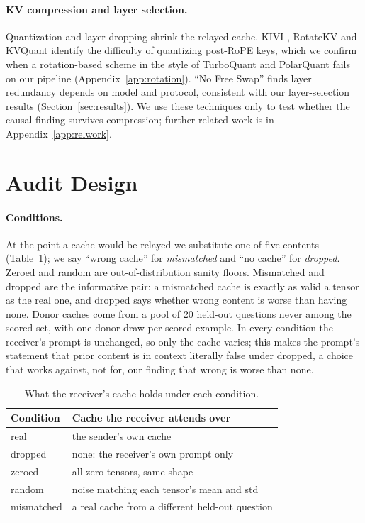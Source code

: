 \documentclass[11pt]{article}
\begin{document}
\paragraph{KV compression and layer selection.} Quantization and layer
dropping shrink the relayed cache. KIVI \citep{kivi2024}, RotateKV
\citep{rotatekv2025} and KVQuant \citep{kvquant2024} identify the
difficulty of quantizing post-RoPE keys, which we confirm when a
rotation-based scheme in the style of TurboQuant \citep{turboquant2026}
and PolarQuant \citep{polarquant2026} fails on our pipeline
(Appendix~\ref{app:rotation}). ``No Free Swap'' \citep{nofreeswap2026}
finds layer redundancy depends on model and protocol, consistent with
our layer-selection results (Section~\ref{sec:results}). We use these
techniques only to test whether the causal finding survives compression;
further related work is in Appendix~\ref{app:relwork}.

\section{Audit Design}
\label{sec:method}

\paragraph{Conditions.} At the point a cache would be relayed we
substitute one of five contents (Table~\ref{tab:conditions}); we say ``wrong
cache'' for \emph{mismatched} and ``no cache'' for \emph{dropped}. Zeroed and
random are out-of-distribution sanity floors. Mismatched and dropped are the
informative pair: a mismatched cache is exactly as valid a tensor as the real
one, and dropped says whether wrong content is worse than having none. Donor caches come from a pool of 20 held-out
questions never among the scored set, with one donor draw per scored
example. In every condition the receiver's prompt is unchanged, so only
the cache varies; this makes the prompt's statement that prior content is
in context literally false under dropped, a choice that works against,
not for, our finding that wrong is worse than none.

\begin{table}[t]
\centering
\small
\caption{What the receiver's cache holds under each condition.}
\label{tab:conditions}
\begin{tabular}{lp{5.2cm}}
\toprule
\textbf{Condition} & \textbf{Cache the receiver attends over} \\
\midrule
real       & the sender's own cache \\
dropped    & none: the receiver's own prompt only \\
zeroed     & all-zero tensors, same shape \\
random     & noise matching each tensor's mean and std \\
mismatched & a real cache from a different held-out question \\
\bottomrule
\end{tabular}
\end{table}
\end{document}
